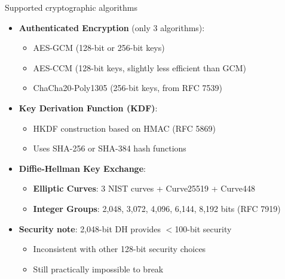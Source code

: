 \documentclass[aspectratio=169, lualatex, handout]{beamer}
\begin{document}
\begin{frame}{Supported cryptographic algorithms}
	\begin{itemize}[<+->]
		\item \textbf{Authenticated Encryption} (only 3 algorithms):
		      \begin{itemize}
			      \item AES-GCM (128-bit or 256-bit keys)
			      \item AES-CCM (128-bit keys, slightly less efficient than GCM)
			      \item ChaCha20-Poly1305 (256-bit keys, from RFC 7539)
		      \end{itemize}
		\item \textbf{Key Derivation Function (KDF)}:
		      \begin{itemize}
			      \item HKDF construction based on HMAC (RFC 5869)
			      \item Uses SHA-256 or SHA-384 hash functions
		      \end{itemize}
		\item \textbf{Diffie-Hellman Key Exchange}:
		      \begin{itemize}
			      \item \textbf{Elliptic Curves}: 3 NIST curves + Curve25519 + Curve448
			      \item \textbf{Integer Groups}: 2,048, 3,072, 4,096, 6,144, 8,192 bits (RFC 7919)
		      \end{itemize}
		\item \textbf{Security note}: 2,048-bit DH provides $<$100-bit security
		      \begin{itemize}
			      \item Inconsistent with other 128-bit security choices
			      \item Still practically impossible to break
		      \end{itemize}
	\end{itemize}
\end{frame}
\end{document}
